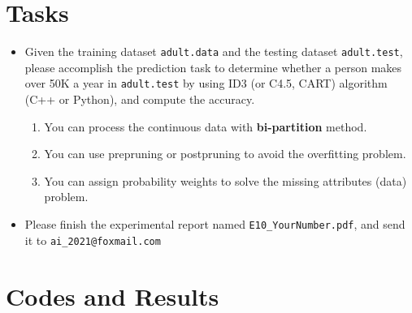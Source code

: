 \documentclass[a4paper, 11pt]{article}
\begin{document}
\section{Tasks}
\begin{itemize}
\item Given the training dataset \texttt{adult.data} and the testing dataset \texttt{adult.test}, please accomplish the prediction task to determine whether a person makes over 50K a year in \texttt{adult.test} by using ID3 (or C4.5, CART) algorithm (C++ or Python), and compute the accuracy. 
\begin{enumerate}
\item You can process the continuous data with \textbf{bi-partition} method.
\item You can use prepruning or postpruning to avoid the overfitting problem.
\item You can assign probability weights to solve the missing attributes (data) problem.
\end{enumerate}

\item Please finish the experimental report named \texttt{E10\_YourNumber.pdf}, and send it to \texttt{ai\_2021@foxmail.com}
\end{itemize}

\section{Codes and Results}


%
%
\end{document}
